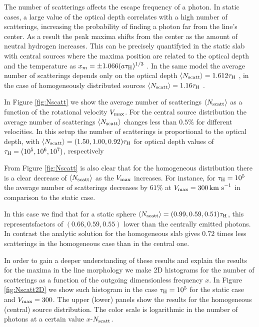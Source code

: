 \documentclass{emulateapj}
\newcommand{\ly}{{\ifmmode{{\rm Ly}\alpha~}\else{Ly$\alpha$~}\fi}}
\newcommand{\kms}{{\ifmmode{{\mathrm{\,km\ s}^{-1}}}\else{\,km~s$^{-1}$}\fi}}
\begin{document}
The number of scatterings affects the escape frequency of a \ly photon.
In static cases, a large value of the optical depth correlates with a
high number of scatterings, increasing the probability of finding a
\ly photon far from the line's center. As a result the peak maxima
shifts from the center as the amount of neutral hydrogen
increases. This can be precisely quantifyied in the static slab
with central sources where the maxima position are related to
the optical depth and the temperature as $x_{m}=\pm 1.066(a\tau_{\rm
  H})^{1/3}$ \citep{Harrington73}. In the same model the average
number of scatterings depends only on the optical depth $\langle
N_{\rm  scatt}\rangle=1.612\tau_{\rm   H}$
\citep{Adams72,Harrington73}, in the case of homogeneously distributed
sources $\langle N_{\rm   scatt}\rangle=1.16\tau_{\rm   H}$
\citep{Harrington73}.   



In Figure \ref{fig:Nscatt} we show the average number of scatterings
$\langle N_{\rm scatt}\rangle$ as a function of the rotational velocity
$V_{\rm max}$. For the central source distribution the average number of
scatterings $\langle N_{\rm   scatt}\rangle$ changes less than $0.5\%$
for different velocities. In this setup the number of scatterings is
proportional to the optical depth, with $\langle N_{\rm
  scatt}\rangle= (1.50, 1.00, 0.92)\tau_{\rm   H}$ for optical depth
values of $\tau_{\rm H} = (10^{5}, 10^{6}, 10^{7})$, respectively


From Figure \ref{fig:Nscatt} is also clear that for the homogeneous
distribution there is a clear decrease of $\langle N_{\rm
  scatt}\rangle$ as the $V_{\rm max}$ increases. For instance, for
$\tau_{\rm H}=10^5$ the average number of scatterings decreases by
$61\%$ at $V_{\rm max}=300\kms$ in comparison to the static case.  

In this case we find that for a static sphere $\langle N_{\rm
  scatt}\rangle= (0.99, 0.59, 0.51)\tau_{\rm   H}$, this
representsfactors of $(0.66, 0.59, 0.55)$ lower than the centrally
emitted photons. In contrast the analytic solution for the homogeneous
slab gives $0.72$ times less scatterings in the homogeneous case than
in the central one. 

In order to gain a deeper understanding of these results and explain
the results for the maxima in the line morphology we make 2D
histograms for the number of scatterings as a function of the outgoing
dimensionless frequency $x$. In Figure \ref{fig:Nscatt2D} we show
such histogram in the case $\tau_{\rm H}=10^5$ for the
static case and $V_{\rm max}=300$\kms. The upper (lower) panels show the
results for the homogeneous (central) source distribution. The color
scale is logarithmic in the number of photons at a certain value
$x$-$N_{\rm scatt}$. 
\end{document}
